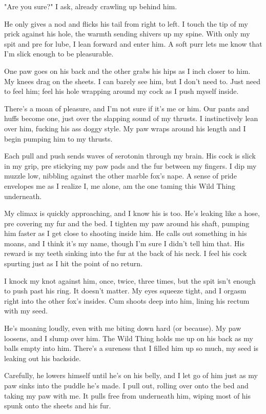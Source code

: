 "Are you sure?" I ask, already crawling up behind him.

He only gives a nod and flicks his tail from right to left. I touch the tip of my prick against his hole, the warmth sending shivers up my spine. With only my spit and pre for lube, I lean forward and enter him. A soft purr lets me know that I'm slick enough to be pleasurable.

One paw goes on his back and the other grabs his hips as I inch closer to him. My knees drag on the sheets. I can barely see him, but I don't need to. Just need to feel him; feel his hole wrapping around my cock as I push myself inside.

There's a moan of pleasure, and I'm not sure if it's me or him. Our pants and huffs become one, just over the slapping sound of my thrusts. I instinctively lean over him, fucking his ass doggy style. My paw wraps around his length and I begin pumping him to my thrusts.

Each pull and push sends waves of serotonin through my brain. His cock is slick in my grip, pre stickying my paw pads and the fur between my fingers. I dip my muzzle low, nibbling against the other marble fox's nape. A sense of pride envelopes me as I realize I, me alone, am the one taming this Wild Thing underneath.

My climax is quickly approaching, and I know his is too. He's leaking like a hose, pre covering my fur and the bed. I tighten my paw around his shaft, pumping him faster as I get close to shooting inside him. He calls out something in his moans, and I think it's my name, though I'm sure I didn't tell him that. His reward is my teeth sinking into the fur at the back of his neck. I feel his cock spurting just as I hit the point of no return.

I knock my knot against him, once, twice, three times, but the spit isn't enough to push past his ring. It doesn't matter. My eyes squeeze tight, and I orgasm right into the other fox's insides. Cum shoots deep into him, lining his rectum with my seed.

He's moaning loudly, even with me biting down hard (or because). My paw loosens, and I slump over him. The Wild Thing holds me up on his back as my balls empty into him. There's a sureness that I filled him up so much, my seed is leaking out his backside.

Carefully, he lowers himself until he's on his belly, and I let go of him just as my paw sinks into the puddle he's made. I pull out, rolling over onto the bed and taking my paw with me. It pulls free from underneath him, wiping most of his spunk onto the sheets and his fur.

